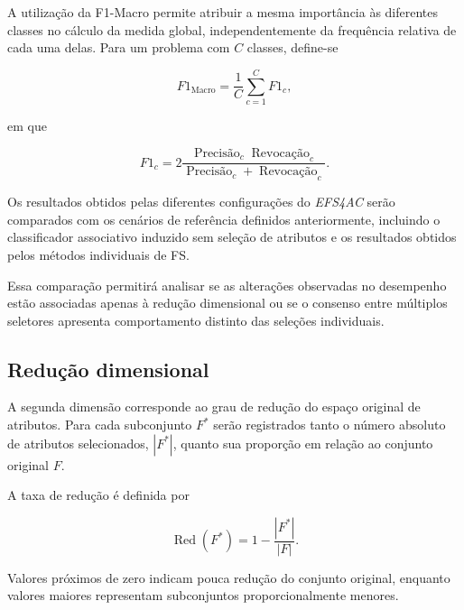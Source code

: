 A utilização da F1-Macro permite atribuir a mesma importância às diferentes
classes no cálculo da medida global, independentemente da frequência relativa
de cada uma delas. Para um problema com $C$ classes, define-se

\begin{equation}
    F1_{\mathrm{Macro}}
    =
    \frac{1}{C}
    \sum_{c=1}^{C}
    F1_c,
    \label{eq:f1-macro-ac-efs}
\end{equation}

em que

\begin{equation}
    F1_c
    =
    2
    \frac{
        \operatorname{Precisão}_c
        \operatorname{Revocação}_c
    }{
        \operatorname{Precisão}_c+
        \operatorname{Revocação}_c
    }.
\end{equation}

Os resultados obtidos pelas diferentes configurações do \textit{EFS4AC} serão
comparados com os cenários de referência definidos anteriormente, incluindo o
classificador associativo induzido sem seleção de atributos e os resultados
obtidos pelos métodos individuais de FS.

Essa comparação permitirá analisar se as alterações observadas no desempenho
estão associadas apenas à redução dimensional ou se o consenso entre múltiplos
seletores apresenta comportamento distinto das seleções individuais.


\subsection{Redução dimensional}
\label{subsec:ac-efs-avaliacao-reducao}

A segunda dimensão corresponde ao grau de redução do espaço original de
atributos. Para cada subconjunto $F^{*}$ serão registrados tanto o número
absoluto de atributos selecionados, $|F^{*}|$, quanto sua proporção em relação
ao conjunto original $F$.

A taxa de redução é definida por

\begin{equation}
    \operatorname{Red}(F^{*})
    =
    1-
    \frac{|F^{*}|}{|F|}.
    \label{eq:reducao-atributos-ac-efs}
\end{equation}

Valores próximos de zero indicam pouca redução do conjunto original, enquanto
valores maiores representam subconjuntos proporcionalmente menores.

